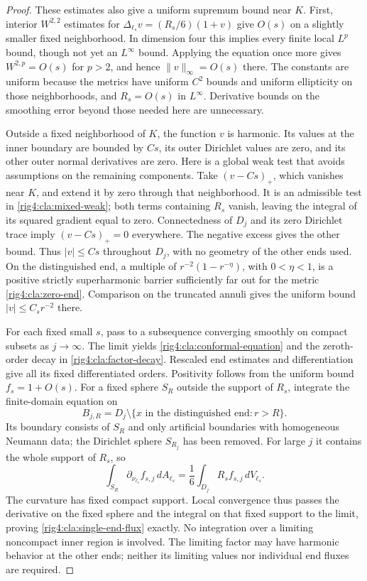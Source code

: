 \begin{proof}
These estimates also give a uniform supremum bound near $K$.
First, interior $W^{2,2}$ estimates for
$\Delta_{\ell_s}v=(R_s/6)(1+v)$ give $O(s)$ on a slightly smaller
fixed neighborhood.  In dimension four this implies every finite
local $L^p$ bound, though not yet an $L^\infty$ bound.
Applying the equation once more gives $W^{2,p}=O(s)$ for $p>2$,
and hence $\|v\|_\infty=O(s)$ there.
The constants are uniform because the metrics have uniform $C^2$
bounds and uniform ellipticity on those neighborhoods, and
$R_s=O(s)$ in $L^\infty$.  Derivative bounds on the smoothing error
beyond those needed here are unnecessary.

Outside a fixed neighborhood of $K$, the function $v$ is harmonic.
Its values at the inner boundary are bounded by $Cs$, its outer
Dirichlet values are zero, and its other outer normal derivatives
are zero.  Here is a global weak test that avoids assumptions on the
remaining components.  Take $(v-Cs)_+$, which vanishes near $K$, and
extend it by zero through that neighborhood.  It is an admissible test
in \eqref{rig4:cla:mixed-weak}; both terms containing $R_s$ vanish, leaving
the integral of its squared gradient equal to zero.  Connectedness of
$D_j$ and its zero Dirichlet trace imply $(v-Cs)_+=0$ everywhere.
The negative excess gives the other bound.  Thus $|v|\le Cs$
throughout $D_j$, with no geometry of the other ends used.
On the distinguished end, a multiple of
$r^{-2}(1-r^{-\eta})$, with $0<\eta<1$, is a positive strictly
superharmonic barrier sufficiently far out for the metric
\eqref{rig4:cla:zero-end}.  Comparison on the truncated annuli gives
the uniform bound $|v|\le C_s r^{-2}$ there.

For each fixed small $s$, pass to a subsequence converging smoothly
on compact subsets as $j\to\infty$.  The limit yields
\eqref{rig4:cla:conformal-equation} and the zeroth-order decay in
\eqref{rig4:cla:factor-decay}.  Rescaled end estimates and differentiation
give all its fixed differentiated orders.  Positivity follows from
the uniform bound $f_s=1+O(s)$.
For a fixed sphere $S_R$ outside the support of $R_s$, integrate
the finite-domain equation on
\[
 B_{j,R}=D_j\setminus\{x\text{ in the distinguished end}:r>R\}.
\]
Its boundary consists of $S_R$ and only artificial boundaries with
homogeneous Neumann data; the Dirichlet sphere $S_{R_j}$ has been
removed.  For large $j$ it contains the whole support of $R_s$, so
\[
 \int_{S_R}\partial_{\nu_{\ell_s}}f_{s,j}\,dA_{\ell_s}
       =\frac16\int_{D_j}R_sf_{s,j}\,dV_{\ell_s}.
\]
The curvature has fixed compact support.  Local convergence thus
passes the derivative on the fixed sphere and the integral on that
fixed support to the limit, proving \eqref{rig4:cla:single-end-flux} exactly.
No integration over a limiting noncompact inner region is involved.
The limiting factor may have harmonic behavior at the other ends;
neither its limiting values nor individual end fluxes are required.


\end{proof}
